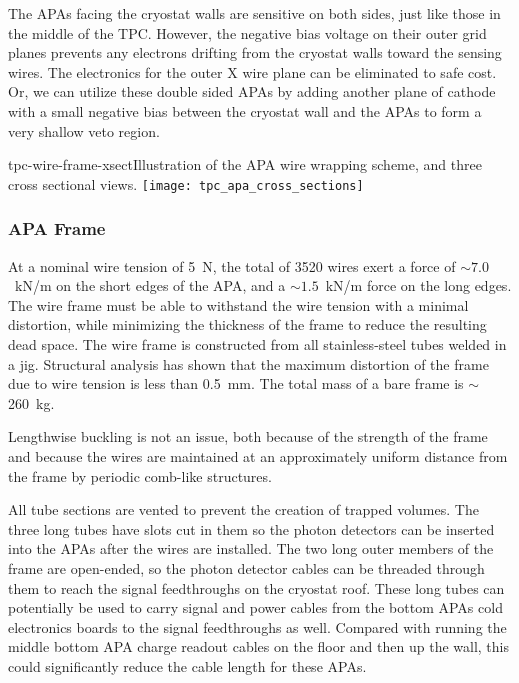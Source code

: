 The APAs facing the cryostat walls are sensitive on both sides, just like those in the middle of the TPC.  However, the negative bias voltage on their outer grid planes prevents any electrons drifting from the cryostat walls toward the sensing wires.  The electronics for the outer X wire plane can be eliminated to safe cost.  Or, we can utilize these double sided APAs by adding another plane of cathode with a small negative bias between the cryostat wall and the APAs to form a very shallow veto region.  

\begin{cdrfigure}{tpc-wire-frame-xsect}{Illustration of the APA wire wrapping scheme, and three cross sectional views.}
\texttt{[image: tpc\_apa\_cross\_sections]}
\end{cdrfigure}



\subsubsection{APA Frame}
\label{subsec:fd-ref-apaframes}

At a nominal wire tension of 5~N, the total of 3520 wires exert a force of 
$\sim 7.0$~kN/m on the short edges of the APA, and a 
$\sim 1.5 $~kN/m force on the long edges. The wire 
frame must be able to withstand the wire tension with a minimal 
distortion, while minimizing the thickness of the 
frame to reduce the resulting dead space. The wire frame is constructed from all stainless-steel tubes welded in a jig.  
Structural analysis has shown that the maximum distortion of the frame due to wire tension is less than 0.5~mm. The total mass of a bare frame is $\sim$260~kg.

Lengthwise buckling is not an issue, both because of the strength of the frame and because the wires are maintained at an approximately uniform distance from the frame by periodic comb-like structures.

All tube sections are vented to prevent the creation of trapped volumes. The three long tubes have slots cut in them so the photon detectors can be inserted into the APAs after the wires are installed.  The two long outer members of the frame are open-ended, so the photon detector cables can be threaded through them to reach the signal feedthroughs on the cryostat roof.  These long tubes can potentially be used to carry signal and power cables from the bottom APAs cold electronics boards to the signal feedthroughs as well.  Compared with running the middle bottom APA charge readout cables on the floor and then up the wall, this could significantly reduce the cable length for these APAs.


